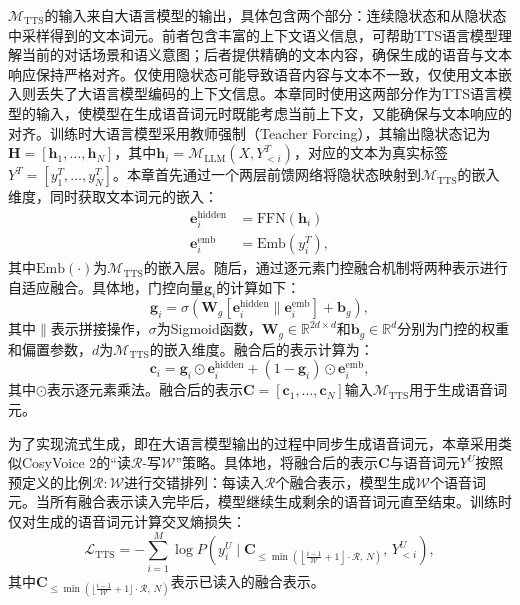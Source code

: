 $\mathcal{M}_\text{TTS}$的输入来自大语言模型的输出，具体包含两个部分：连续隐状态和从隐状态中采样得到的文本词元。前者包含丰富的上下文语义信息，可帮助TTS语言模型理解当前的对话场景和语义意图；后者提供精确的文本内容，确保生成的语音与文本响应保持严格对齐。仅使用隐状态可能导致语音内容与文本不一致，仅使用文本嵌入则丢失了大语言模型编码的上下文信息。本章同时使用这两部分作为TTS语言模型的输入，使模型在生成语音词元时既能考虑当前上下文，又能确保与文本响应的对齐。训练时大语言模型采用教师强制（Teacher Forcing），其输出隐状态记为$\mathbf{H} = [\mathbf{h}_1, \ldots, \mathbf{h}_N]$，其中$\mathbf{h}_i = \mathcal{M}_\text{LLM}(X, Y^T_{<i})$，对应的文本为真实标签$Y^T = [y^T_1, \ldots, y^T_N]$。本章首先通过一个两层前馈网络将隐状态映射到$\mathcal{M}_\text{TTS}$的嵌入维度，同时获取文本词元的嵌入：
\begin{align}
    \mathbf{e}^{\text{hidden}}_i &= \text{FFN}(\mathbf{h}_i) \\
    \mathbf{e}^{\text{emb}}_i &= \text{Emb}(y^T_i),
\end{align}
其中$\text{Emb}(\cdot)$为$\mathcal{M}_\text{TTS}$的嵌入层。随后，通过逐元素门控融合机制将两种表示进行自适应融合。具体地，门控向量$\mathbf{g}_i$的计算如下：
\begin{equation}
    \mathbf{g}_i = \sigma\left( \mathbf{W}_g \left[ \mathbf{e}_i^{\text{hidden}} \parallel \mathbf{e}_i^{\text{emb}} \right] + \mathbf{b}_g \right),
\end{equation}
其中$\parallel$表示拼接操作，$\sigma$为Sigmoid函数，$\mathbf{W}_g \in \mathbb{R}^{2d \times d}$和$\mathbf{b}_g \in \mathbb{R}^d$分别为门控的权重和偏置参数，$d$为$\mathcal{M}_\text{TTS}$的嵌入维度。融合后的表示计算为：
\begin{equation}
    \mathbf{c}_i = \mathbf{g}_i \odot \mathbf{e}_i^{\text{hidden}} + (1 - \mathbf{g}_i) \odot \mathbf{e}_i^{\text{emb}},
\end{equation}
其中$\odot$表示逐元素乘法。融合后的表示$\mathbf{C} = [\mathbf{c}_1, \ldots, \mathbf{c}_N]$输入$\mathcal{M}_\text{TTS}$用于生成语音词元。

为了实现流式生成，即在大语言模型输出的过程中同步生成语音词元，本章采用类似CosyVoice 2的``读$\mathcal{R}$-写$\mathcal{W}$''策略。具体地，将融合后的表示$\mathbf{C}$与语音词元$Y^U$按照预定义的比例$\mathcal{R}:\mathcal{W}$进行交错排列：每读入$\mathcal{R}$个融合表示，模型生成$\mathcal{W}$个语音词元。当所有融合表示读入完毕后，模型继续生成剩余的语音词元直至结束。训练时仅对生成的语音词元计算交叉熵损失：
\begin{equation}
    \mathcal{L}_\text{TTS} = -\sum_{i=1}^{M} \log P\left(y^U_i \mid \mathbf{C}_{\leq \min\left(\left\lfloor \frac{i-1}{\mathcal{W}}+1 \right\rfloor \cdot \mathcal{R},\, N\right)},\, Y^U_{<i}\right),
\end{equation}
其中$\mathbf{C}_{\leq \min(\lfloor \frac{i-1}{\mathcal{W}}+1 \rfloor \cdot \mathcal{R},\, N)}$表示已读入的融合表示。

